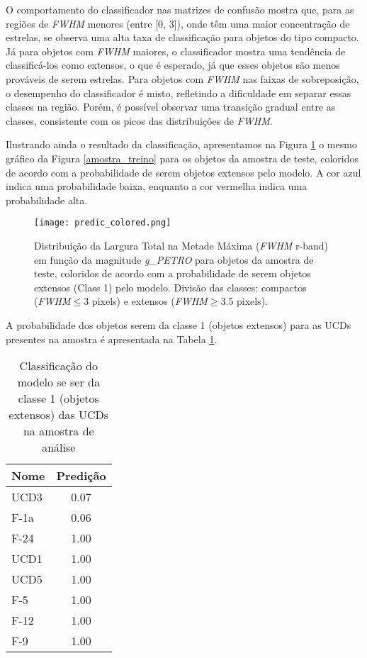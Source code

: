 \vspace{\baselineskip}

O comportamento do classificador nas matrizes de confusão mostra que, para as regiões de \textit{FWHM} menores (entre [0, 3]), onde têm uma maior concentração de estrelas, se observa uma alta taxa de classificação para objetos do tipo compacto. Já para objetos com \textit{FWHM} maiores, o classificador mostra uma tendência de classificá-los como extensos, o que é esperado, já que esses objetos são menos prováveis de serem estrelas. Para objetos com \textit{FWHM} nas faixas de sobreposição, o desempenho do classificador é misto, refletindo a dificuldade em separar essas classes na região. Porém, é possível observar uma transição gradual entre as classes, consistente com os picos das distribuições de \textit{FWHM}.

\vspace{\baselineskip}

Ilustrando ainda o resultado da classificação, apresentamos na Figura \ref{predic_colored} o mesmo gráfico da Figura \ref{amostra_treino} para os objetos da amostra de teste, coloridos de acordo com a probabilidade de serem objetos extensos pelo modelo. A cor azul indica uma probabilidade baixa, enquanto a cor vermelha indica uma probabilidade alta.


\begin{figure}[!ht]
    \centering
    \texttt{[image: predic\_colored.png]}
    \caption[]{Distribuição da Largura Total na Metade Máxima (\textit{FWHM} r-band) em função da magnitude \textit{g\_PETRO} para objetos da amostra de teste, coloridos de acordo com a probabilidade de serem objetos extensos (Class 1) pelo modelo. Divisão das classes: compactos (\textit{FWHM}$\leq$3 pixels) e extensos (\textit{FWHM}$\geq$3.5 pixels).}
    \label{predic_colored}
\end{figure}

\vspace{\baselineskip}

A probabilidade dos objetos serem da classe 1 (objetos extensos) para as UCDs presentes na amostra é apresentada na Tabela \ref{ucds_predict}.

\begin{table}[H]
    \centering
    \caption{Classificação do modelo se ser da classe 1 (objetos extensos) das UCDs na amostra de análise}
    \begin{tabular}{lc}
        \toprule
        Nome & Predição  \\
        \midrule
        UCD3 & 0.07 \\
        F-1a & 0.06 \\
        F-24 & 1.00 \\
        UCD1 & 1.00 \\
        UCD5 & 1.00 \\
        F-5 & 1.00 \\
        F-12 & 1.00 \\
        F-9 & 1.00 \\
        \midrule
    \end{tabular}
    \label{ucds_predict}
\end{table}

